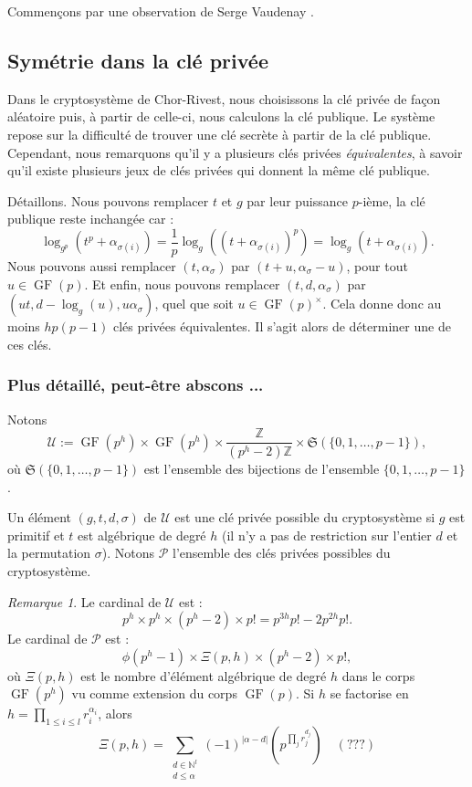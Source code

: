 \documentclass[a4paper, titlepage]{article}
\theoremstyle{definition}
\theoremstyle{remark}
\newtheorem{rema}[theo]{Remarque}
\def\N{\mathbb N}
\def\Z{\mathbb Z}
\def\gf{\operatorname{GF}}
\begin{document}
Commençons par une observation de Serge Vaudenay \cite[Section 3]{vaudenay2000}.

\subsection{Symétrie dans la clé privée}\label{symetrieClePrivee}

Dans le cryptosystème de Chor-Rivest, nous choisissons la clé privée de façon aléatoire puis, à partir de celle-ci, nous calculons la clé publique. Le système repose sur la difficulté de trouver une clé secrète à partir de la clé publique. Cependant, nous remarquons qu'il y a plusieurs clés privées \textit{équivalentes}, à savoir qu'il existe plusieurs jeux de clés privées qui donnent la même clé publique.

Détaillons. Nous pouvons remplacer $t$ et $g$ par leur puissance $p$-ième, la clé publique reste inchangée car :
$$\log_{g^p}\left(t^p + \alpha_{\sigma(i)}\right) = \frac{1}{p}\log_{g}\left(\left(t + \alpha_{\sigma(i)}\right)^p\right) = \log_{g}\left(t + \alpha_{\sigma(i)}\right).$$
Nous pouvons aussi remplacer $(t, \alpha_{\sigma})$ par $(t + u, \alpha_{\sigma} - u)$, pour tout $u \in \gf(p)$. Et enfin, nous pouvons remplacer $(t,d,\alpha_\sigma)$ par $(ut, d - \log_g(u), u\alpha_\sigma)$, quel que soit $u \in \gf(p)^\times$.
Cela donne donc au moins $hp(p-1)$ clés privées équivalentes. Il s'agit alors de déterminer une de ces clés.

\subsubsection*{Plus détaillé, peut-être abscons ...}

Notons $$\mathcal{U} := \gf(p^h) \times \gf(p^h) \times \frac{\Z}{(p^h-2)\Z} \times \mathfrak{S}(\{0,1,\dots, p-1\}),$$
où $\mathfrak{S}(\{0,1,\dots, p-1\})$ est l'ensemble des bijections de l'ensemble $\{0,1,\dots, p-1\}$.

Un élément $(g, t, d, \sigma)$ de $\mathcal{U}$ est une clé privée possible du cryptosystème si $g$ est primitif et $t$ est algébrique de degré $h$ (il n'y a pas de restriction sur l'entier $d$ et la permutation $\sigma$). Notons $\mathcal{P}$ l'ensemble des clés privées possibles du cryptosystème.

\begin{rema}
Le cardinal de $\mathcal{U}$ est :
$$p^h \times p^h \times (p^h - 2) \times p! = p^{3h}p! - 2p^{2h}p!.$$
Le cardinal de $\mathcal{P}$ est :
$$\phi(p^h - 1) \times \Xi(p,h) \times (p^h - 2) \times p!,$$
où $\Xi(p, h)$ est le nombre d'élément algébrique de degré $h$ dans le corps $\gf(p^h)$ vu comme extension du corps $\gf(p)$. Si $h$ se factorise en $h = \prod_{1\leqslant i \leqslant l} r_i^{\alpha_{i}}$, alors
$$\Xi(p,h) = \sum_{\substack{d \in \N^l \\ d \leqslant \alpha}} (-1)^{|\alpha - d|} \left( p^{\prod_j r_j^{d_j}}\right)\quad(???)$$
\end{rema}
\end{document}
